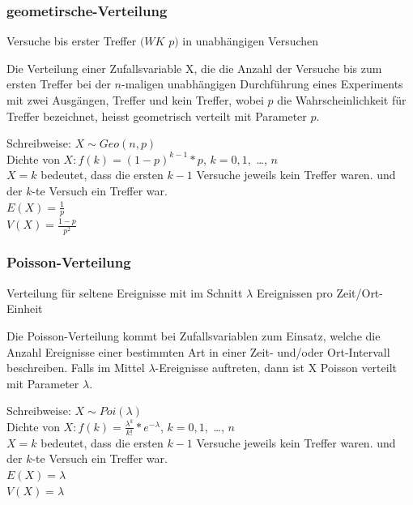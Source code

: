\documentclass[10pt]{article}
\newtheorem[M]{definition}{Def.}
\newtheorem[M]{satz}{Satz}
\numberwithin{equation}{section}
\begin{document}
\subsubsection{geometirsche-Verteilung}
Versuche bis erster Treffer $(WK$ $p)$ in unabhängigen Versuchen 
\begin{definition}
Die Verteilung einer Zufallsvariable X, die die Anzahl der Versuche bis zum ersten Treffer bei der $n$-maligen unabhängigen Durchführung eines Experiments mit zwei Ausgängen, Treffer und kein Treffer, wobei $p$ die Wahrscheinlichkeit für Treffer bezeichnet, heisst geometrisch verteilt mit Parameter $p$. \\
\end{definition}
Schreibweise: $X \sim Geo(n,p)$ \\
Dichte von $X : f(k) = (1-p)^{k-1}*p$, $k=0,1,$ \dots, $n$ \\
$X=k$ bedeutet, dass die ersten $k-1$ Versuche jeweils kein Treffer waren. und der $k$-te Versuch ein Treffer war.
\\
$E(X) = \frac{1}{p}$ \\
$V(X) = \frac{1-p}{p^2}$ \\

\subsubsection{Poisson-Verteilung}
Verteilung für seltene Ereignisse mit im Schnitt $\lambda$ Ereignissen pro Zeit/Ort-Einheit
\begin{definition}
Die Poisson-Verteilung kommt bei Zufallsvariablen zum Einsatz, welche die Anzahl Ereignisse einer bestimmten Art in einer Zeit- und/oder Ort-Intervall beschreiben. Falls im Mittel $\lambda$-Ereignisse auftreten, dann ist X Poisson verteilt mit Parameter $\lambda$. \\
\end{definition}
Schreibweise: $X \sim Poi(\lambda)$ \\
Dichte von $X : f(k) =\frac{\lambda^k}{k!}*e^{-\lambda}$, $k=0,1,$ \dots, $n$ \\
$X=k$ bedeutet, dass die ersten $k-1$ Versuche jeweils kein Treffer waren. und der $k$-te Versuch ein Treffer war.
\\
$E(X) = \lambda$ \\
$V(X) = \lambda$ \\
\end{document}
